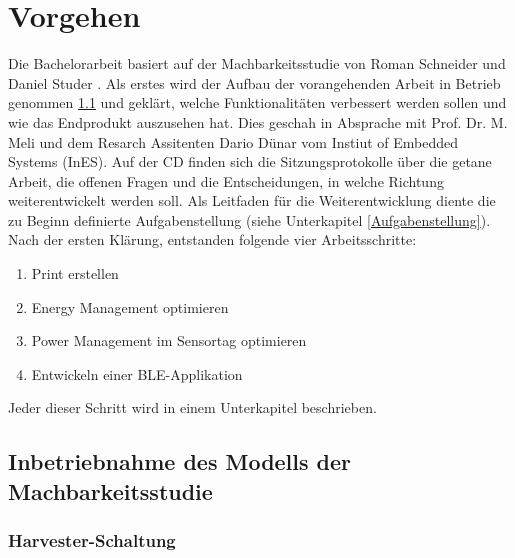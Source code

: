 \chapter{Vorgehen}
 
 Die Bachelorarbeit basiert auf der Machbarkeitsstudie von Roman Schneider und Daniel Studer \cite{PA_bicycle}. Als erstes wird der Aufbau der vorangehenden Arbeit in Betrieb genommen \ref{v_inbetriebnahme} und geklärt, welche Funktionalitäten verbessert werden sollen und wie das Endprodukt auszusehen hat. Dies geschah in Absprache mit Prof. Dr. M. Meli und dem Resarch Assitenten Dario Dünar vom Instiut of Embedded Systems (InES). Auf der CD finden sich die Sitzungsprotokolle über die getane Arbeit, die offenen Fragen und die Entscheidungen, in welche Richtung weiterentwickelt werden soll. Als Leitfaden für die Weiterentwicklung diente die zu Beginn definierte Aufgabenstellung (siehe Unterkapitel \ref{Aufgabenstellung}).\\
Nach der ersten Klärung, entstanden folgende vier Arbeitsschritte:

\begin{enumerate}
  \item Print erstellen
  \item Energy Management optimieren
  \item Power Management im Sensortag optimieren
  \item Entwickeln einer BLE-Applikation
 \end{enumerate}  

Jeder dieser Schritt wird in einem Unterkapitel beschrieben.
 
\section{Inbetriebnahme des Modells der Machbarkeitsstudie}\label{v_inbetriebnahme} 


\subsection{Harvester-Schaltung}

